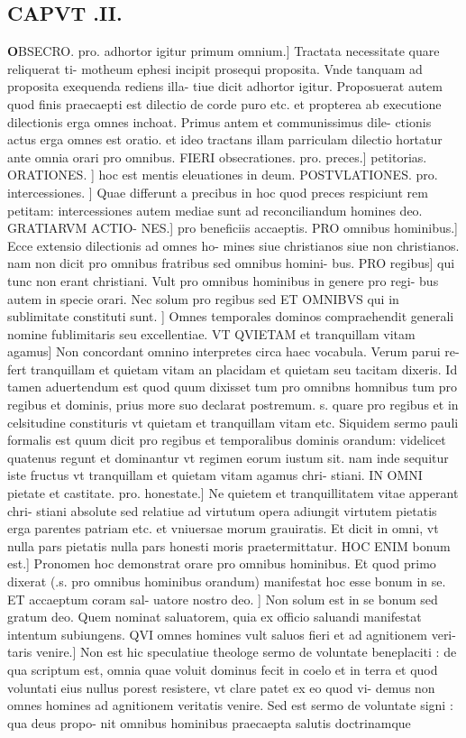 \documentclass{article}
\begin{document}
\begin{pages}
\endnumbering\beginnumbering\section{CAPVT .II.}\pstart \huge\textbf{O}\normalsize BSECRO. pro. adhortor igitur primum omnium.] Tractata necessitate quare reliquerat ti- motheum ephesi incipit prosequi proposita. Vnde tanquam ad proposita exequenda rediens illa- tiue dicit adhortor igitur. Proposuerat autem quod finis praecaepti est dilectio de corde puro etc. et propterea ab executione dilectionis erga omnes inchoat. Primus antem et communissimus dile- ctionis actus erga omnes est oratio. et ideo tractans illam parriculam dilectio hortatur ante omnia orari pro omnibus. FIERI obsecrationes. pro. preces.] petitorias. ORATIONES. ] hoc est mentis eleuationes in deum. POSTVLATIONES. pro. intercessiones. ] Quae differunt a precibus in hoc quod preces respiciunt rem petitam: intercessiones autem mediae sunt ad reconciliandum homines deo. GRATIARVM ACTIO- NES.] pro beneficiis accaeptis. PRO omnibus hominibus.] Ecce extensio dilectionis ad omnes ho- mines siue christianos siue non christianos. nam non dicit pro omnibus fratribus sed omnibus homini- bus. PRO regibus] qui tunc non erant christiani. Vult pro omnibus hominibus in genere pro regi- bus autem in specie orari. Nec solum pro regibus sed ET OMNIBVS qui in sublimitate constituti sunt. ] Omnes temporales dominos compraehendit generali nomine fublimitaris seu excellentiae. VT QVIETAM et tranquillam vitam agamus] Non concordant omnino interpretes circa haec vocabula. Verum parui re- fert tranquillam et quietam vitam an placidam et quietam seu tacitam dixeris. Id tamen aduertendum est quod quum dixisset tum pro omnibns homnibus tum pro regibus et dominis, prius more suo declarat postremum. s. quare pro regibus et in celsitudine constituris vt quietam et tranquillam vitam etc. Siquidem sermo pauli formalis est quum dicit pro regibus et temporalibus dominis orandum: videlicet quatenus regunt et dominantur vt regimen eorum iustum sit. nam inde sequitur iste fructus vt tranquillam et quietam vitam agamus chri- stiani. IN OMNI pietate et castitate. pro. honestate.] Ne quietem et tranquillitatem vitae apperant chri- stiani absolute sed relatiue ad virtutum opera adiungit virtutem pietatis erga parentes patriam etc. et vniuersae morum grauiratis. Et dicit in omni, vt nulla pars pietatis nulla pars honesti moris praetermittatur.  \pend\pstart HOC ENIM bonum est.] Pronomen hoc demonstrat orare pro omnibus hominibus. Et quod primo dixerat (.s. pro omnibus hominibus orandum) manifestat hoc esse bonum in se. ET accaeptum coram sal- uatore nostro deo. ] Non solum est in se bonum sed gratum deo. Quem nominat saluatorem, quia ex officio saluandi manifestat intentum subiungens. QVI omnes homines vult saluos fieri et ad agnitionem veri- taris venire.] Non est hic speculatiue theologe sermo de voluntate beneplaciti : de qua scriptum est, omnia quae voluit dominus fecit in coelo et in terra et quod voluntati eius nullus porest resistere, vt clare patet ex eo quod vi- demus non omnes homines ad agnitionem veritatis venire. Sed est sermo de voluntate signi : qua deus propo- nit omnibus hominibus praecaepta salutis doctrinamque 
\end{pages}
\end{document}
